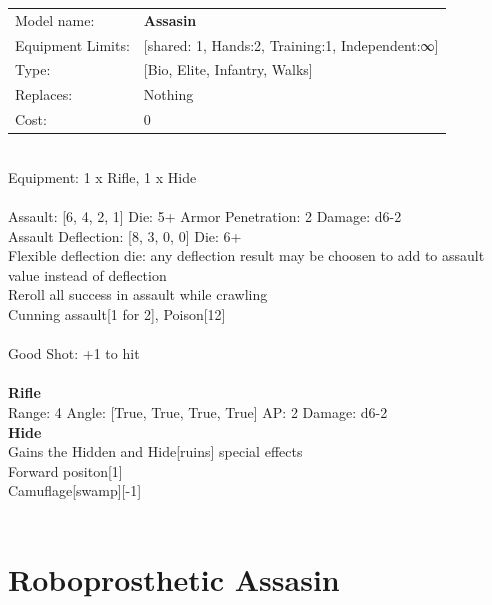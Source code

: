 {\noindent
\begin{tabular}{ll}
Model name: &{\bf Assasin } \\
Equipment Limits: &[shared: 1, Hands:2, Training:1, Independent:∞] \\
Type: &[Bio, Elite, Infantry, Walks] \\
Replaces: &Nothing \\
Cost: & 0\\
\end{tabular}
\ \\
Equipment: 1 x Rifle, 1 x Hide \\
\ \\
Assault: [6, 4, 2, 1] Die: 5+ Armor Penetration: 2 Damage: d6-2 \\
Assault Deflection: [8, 3, 0, 0] Die: 6+\\
\indent Flexible deflection die: any deflection result may be choosen to add to assault value instead of deflection\\ 
Reroll all success in assault while crawling\\ 
Cunning assault[1 for 2], Poison[12]\\ 
 
\ \\
Good Shot: +1 to hit\\ 

\ \\
{\bf Rifle } \\



Range: 4  Angle: [True, True, True, True] AP: 2 Damage: d6-2 \\




{\bf Hide } \\

Gains the Hidden and Hide[ruins] special effects\\ 
Forward positon[1]\\ 
Camuflage[swamp][-1]\\ 





 
\ \\













\clearpage

\section{ Roboprosthetic Assasin }

}
